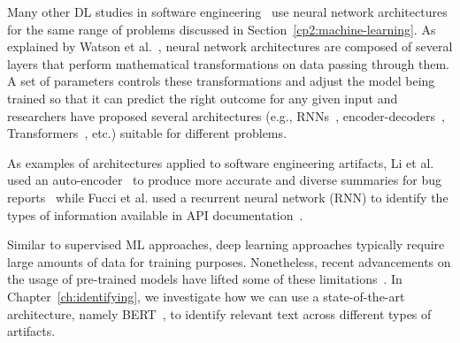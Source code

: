 Many other \acs{DL} studies in software engineering~\cite{ferreira2021,li2018deep}
use neural network architectures 
for the same range of problems discussed in Section~\ref{cp2:machine-learning}.
As explained by Watson et al.~\cite{watson2022},
neural network architectures are composed of several layers 
that perform mathematical transformations on data passing through them. 
A set of parameters controls these transformations and 
adjust the model being trained so that it can predict 
the right outcome for any given input
and researchers have proposed 
several architectures (e.g., \acs{RNN}s~\cite{rumelhart1986rnn, sutskever2014seq2seq}, encoder-decoders~\cite{bahdanau2014neural}, Transformers~\cite{Vaswani2017attention}, etc.) 
suitable for different problems. 



As examples of architectures applied to software engineering  artifacts,
Li et al. used an auto-encoder~\cite{liou2014autoencoder}
to produce more accurate and diverse summaries 
for bug reports~\cite{li2018deep} while 
Fucci et al. used a 
recurrent neural network (\acs{RNN}) 
to identify the types of information available in 
API documentation~\cite{fucci2019}.



Similar to supervised \acs{ML} approaches, deep learning approaches 
typically require large amounts of data for training purposes.
Nonetheless, recent advancements on the usage of
pre-trained models 
have lifted some of these limitations~\cite{erhan2010pre-train}.
In Chapter~\ref{ch:identifying},
we investigate how we can use a state-of-the-art architecture, namely BERT~\cite{Devlin2018Bert},
to identify relevant text across different types of artifacts.
















